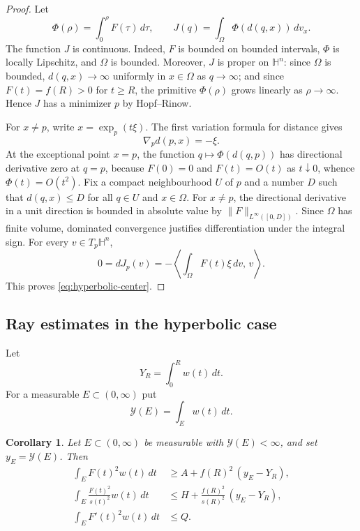 \documentclass[11pt]{amsart}
\newtheorem{corollary}[theorem]{Corollary}
\theoremstyle{remark}
\newcommand{\HH}{\mathbb H}
\begin{document}
\begin{proof}
Let
$$
        \Phi(\rho)=\int_0^\rho F(\tau)\,d\tau,
        \qquad
        J(q)=\int_\Omega \Phi(d(q,x))\,dv_x.
$$
The function $J$ is continuous.  Indeed, $F$ is bounded on bounded intervals, $\Phi$ is locally Lipschitz, and $\Omega$ is bounded.  Moreover, $J$ is proper on $\HH^n$: since $\Omega$ is bounded, $d(q,x)\to\infty$ uniformly in $x\in\Omega$ as $q\to\infty$; and since $F(t)=f(R)>0$ for $t\ge R$, the primitive $\Phi(\rho)$ grows linearly as $\rho\to\infty$.  Hence $J$ has a minimizer $p$ by Hopf--Rinow.

For $x\ne p$, write $x=\exp_p(t\xi)$.  The first variation formula for distance gives
$$
        \nabla_p d(p,x)=-\xi.
$$
At the exceptional point $x=p$, the function $q\mapsto \Phi(d(q,p))$ has directional derivative zero at $q=p$, because $F(0)=0$ and $F(t)=O(t)$ as $t\downarrow0$, whence $\Phi(t)=O(t^2)$.  Fix a compact neighbourhood $U$ of $p$ and a number $D$ such that $d(q,x)\le D$ for all $q\in U$ and $x\in\Omega$.  For $x\ne p$, the directional derivative in a unit direction is bounded in absolute value by $\|F\|_{L^\infty([0,D])}$.  Since $\Omega$ has finite volume, dominated convergence justifies differentiation under the integral sign.  For every $v\in T_p\HH^n$,
$$
        0=dJ_p(v)=-\left\langle \int_\Omega F(t)\xi\,dv,\,v\right\rangle.
$$
This proves \eqref{eq:hyperbolic-center}.
\end{proof}

\subsection{Ray estimates in the hyperbolic case}

Let
\begin{equation}\label{eq:hyperbolic-Y-R-def}
        Y_R=\int_0^R w(t)\,dt.
\end{equation}
For a measurable $E\subset(0,\infty)$ put
$$
        \mathcal Y(E)=\int_Ew(t)\,dt.
$$

\begin{corollary}\label{cor:hyperbolic-ray-scalar}
Let $E\subset(0,\infty)$ be measurable with $\mathcal Y(E)<\infty$, and set $y_E=\mathcal Y(E)$.  Then
\begin{align}
        \int_E F(t)^2w(t)\,dt
        &\ge A+f(R)^2\,(y_E-Y_R),
        \label{eq:hyperbolic-mass-ray}\\
        \int_E \frac{F(t)^2}{s(t)^2}w(t)\,dt
        &\le H+\frac{f(R)^2}{s(R)^2}\,(y_E-Y_R),
        \label{eq:hyperbolic-angular-ray}\\
        \int_E F'(t)^2w(t)\,dt
        &\le Q.
        \label{eq:hyperbolic-radial-ray}
\end{align}
\end{corollary}
\end{document}
